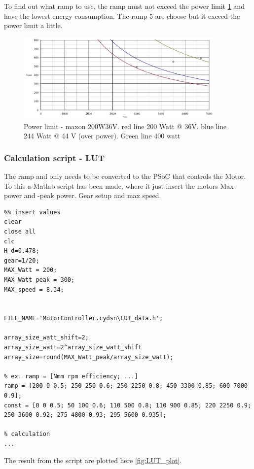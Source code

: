 To find out what ramp to use, the ramp must not exceed the power limit \ref{fig:eff_maxon_36V_Power_limit} and have the lowest energy consumption. The ramp 5 are choose but it exceed the power limit a little.

\begin{figure}[H]
	\centering
	\includegraphics [width=4in]{Software/Pictures/Power_limit.PNG}
	\caption{Power limit - maxon 200W36V. red line 200 Watt @ 36V. blue line 244 Watt @ 44 V (over power). Green line 400 watt}
	\label{fig:eff_maxon_36V_Power_limit}
\end{figure}

\subsubsection{Calculation script - LUT}

The ramp and only needs to be converted to the PSoC that controls the Motor. To this a Matlab script has been made, where it just insert the motors Max-power and -peak power. Gear setup and max speed.    
\lstset{language=matlab}
\begin{lstlisting}
%% insert values
clear
close all
clc
H_d=0.478;
gear=1/20;
MAX_Watt = 200;
MAX_Watt_peak = 300;
MAX_speed = 8.34;


FILE_NAME='MotorController.cydsn\LUT_data.h';

array_size_watt_shift=2;
array_size_watt=2^array_size_watt_shift
array_size=round(MAX_Watt_peak/array_size_watt);

% ex. ramp = [Nmm rpm efficiency; ...]
ramp = [200 0 0.5; 250 250 0.6; 250 2250 0.8; 450 3300 0.85; 600 7000 0.9];
const = [0 0 0.5; 50 100 0.6; 110 500 0.8; 110 900 0.85; 220 2250 0.9; 250 3600 0.92; 275 4800 0.93; 295 5600 0.935];

% calculation
...
\end{lstlisting}

The result from the script are plotted here \ref{fig:LUT_plot}. 

